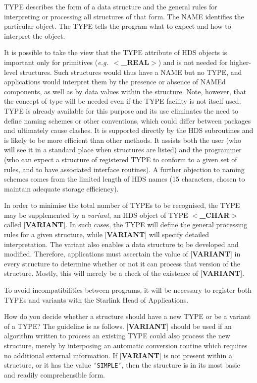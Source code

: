 TYPE describes the form of a data structure and the general rules
for interpreting or processing all structures of that form.  The NAME
identifies the particular object.  The TYPE tells the program what to 
expect and how to interpret the object.

It is possible to take the view that the TYPE attribute
of HDS objects is important only for
primitives ({\it e.g.}\  $<${\bf \_REAL}$>$) and is not needed for
higher-level structures.
Such structures would thus have a NAME but no TYPE, and applications
would interpret them by the presence or absence of NAMEd components, as
well as by data values within the structure.
Note, however, that the concept of type will be needed even if the
TYPE facility is not itself used.
TYPE is already available for this purpose and its use eliminates
the need to define naming schemes or other conventions, which could
differ between packages and ultimately cause clashes.  It is supported
directly by the HDS subroutines and is likely to be more efficient than
other methods.  It assists both the user (who will see it in a standard
place when structures are listed) and the programmer (who can expect a
structure of registered TYPE to conform to a given set of rules,
and to have associated interface routines).  A
further objection to naming schemes comes from the limited length of HDS
names (15 characters, chosen to maintain adequate storage efficiency). 

In order to minimise the total number of TYPEs to be recognised, 
the TYPE may be supplemented by
a {\it variant}, an HDS object
of TYPE $<${\bf \_CHAR}$>$
called [{\bf VARIANT}{]}.  In such cases,
the TYPE will define the general processing rules for a given
structure, while
{[}{\bf VARIANT}{]}
will specify detailed interpretation.  The variant also enables a data
structure to be developed and modified.  Therefore, applications must
ascertain the value of {[}{\bf VARIANT}{]} in every structure to
determine whether or not it can process that version of the structure. 
Mostly, this will merely be a check of the existence of {[}{\bf VARIANT}{]}.

To avoid incompatibilities between programs, it will be necessary to
register both TYPEs and variants with the Starlink Head of Applications. 

How do you decide whether a structure should have
a new TYPE or be a variant of a TYPE?  The guideline is as
follows.  {[}{\bf VARIANT}{]} should be used
if an algorithm written to process an existing TYPE could also process
the new structure, merely by interposing an automatic conversion routine
which requires no additional external information.
If {[}{\bf VARIANT}{]} is not present within a structure,
or it has the value {\tt `SIMPLE'},
then the structure is in its most basic and readily
comprehensible form.

